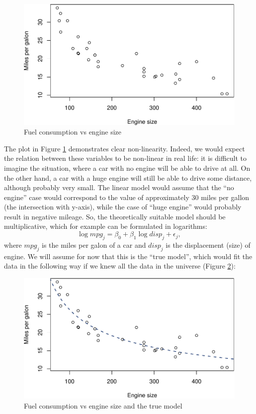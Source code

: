 \documentclass[
]{book}
\theoremstyle{definition}
\theoremstyle{definition}
\theoremstyle{definition}
\theoremstyle{definition}
\theoremstyle{remark}
\begin{document}
\begin{figure}
\centering
\includegraphics{Svetunkov---Statistics-for-Business-Analytics_files/figure-latex/biasVariance01-1.pdf}
\caption{\label{fig:biasVariance01}Fuel consumption vs engine size}
\end{figure}

The plot in Figure \ref{fig:biasVariance01} demonstrates clear non-linearity. Indeed, we would expect the relation between these variables to be non-linear in real life: it is difficult to imagine the situation, where a car with no engine will be able to drive at all. On the other hand, a car with a huge engine will still be able to drive some distance, although probably very small. The linear model would assume that the ``no engine'' case would correspond to the value of approximately 30 miles per gallon (the intersection with y-axis), while the case of ``huge engine'' would probably result in negative mileage. So, the theoretically suitable model should be multiplicative, which for example can be formulated in logarithms:
\begin{equation}
    \log mpg_j = \beta_0 + \beta_1 \log disp_j + \epsilon_j ,
    \label{eq:mpgLinear}
\end{equation}
where \(mpg_j\) is the miles per galon of a car and \(disp_j\) is the displacement (size) of engine. We will assume for now that this is the ``true model'', which would fit the data in the following way if we knew all the data in the universe (Figure \ref{fig:biasVariance02}):

\begin{figure}
\centering
\includegraphics{Svetunkov---Statistics-for-Business-Analytics_files/figure-latex/biasVariance02-1.pdf}
\caption{\label{fig:biasVariance02}Fuel consumption vs engine size and the true model}
\end{figure}
\end{document}

